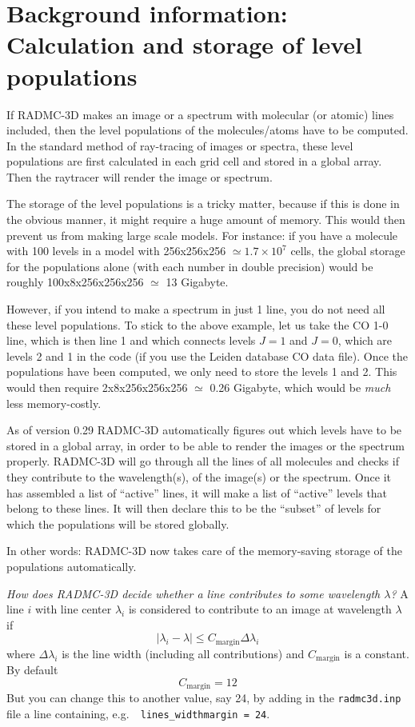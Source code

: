 \documentclass{report}
\begin{document}
\section{Background information: Calculation and storage of level populations}
\label{sec-calcstore-levpop}
%
If RADMC-3D makes an image or a spectrum with molecular (or atomic) lines
included, then the level populations of the molecules/atoms have to be
computed. In the standard method of ray-tracing of images or spectra, these
level populations are first calculated in each grid cell and stored in a
global array. Then the raytracer will render the image or spectrum. 

The storage of the level populations is a tricky matter, because if this is
done in the obvious manner, it might require a huge amount of memory. This
would then prevent us from making large scale models. For instance: if you
have a molecule with 100 levels in a model with 256x256x256 $\simeq
1.7\times 10^7$ cells, the global storage for the populations alone (with
each number in double precision) would be roughly 100x8x256x256x256 $\simeq$
13 Gigabyte.

However, if you intend to make a spectrum in just 1 line, you do not need
all these level populations. To stick to the above example, let us take the
CO 1-0 line, which is then line 1 and which connects levels $J=1$ and $J=0$,
which are levels 2 and 1 in the code (if you use the Leiden database CO data
file).  Once the populations have been computed, we only need to store the
levels 1 and 2. This would then require 2x8x256x256x256 $\simeq$ 0.26
Gigabyte, which would be {\em much} less memory-costly.

As of version 0.29 RADMC-3D automatically figures out which levels have to
be stored in a global array, in order to be able to render the images or the
spectrum properly. RADMC-3D will go through all the lines of all molecules
and checks if they contribute to the wavelength(s), of the image(s) or the
spectrum. Once it has assembled a list of ``active'' lines, it will make a
list of ``active'' levels that belong to these lines. It will then declare
this to be the ``subset'' of levels for which the populations will be stored
globally.

In other words: RADMC-3D now takes care of the memory-saving storage of
the populations automatically.

{\em How does RADMC-3D decide whether a line contributes to some wavelength
  $\lambda$?} A line $i$ with line center $\lambda_i$ is considered to
contribute to an image at wavelength $\lambda$ if 
\begin{equation}
| \lambda_i-\lambda | \le C_{\mathrm{margin}}\Delta\lambda_i
\end{equation}
where $\Delta\lambda_i$ is the line width (including all contributions) and
$C_{\mathrm{margin}}$ is a constant. By default
\begin{equation}
C_{\mathrm{margin}} = 12
\end{equation}
But you can change this to another value, say 24, by adding in the
{\small\tt radmc3d.inp} file a line containing, e.g.\ {\small\tt
  lines\_widthmargin = 24}.
\end{document}
